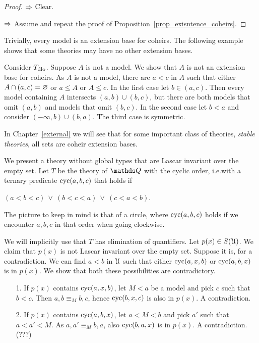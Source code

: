 \documentclass[creche.tex]{subfiles}
\begin{document}
\begin{proof} 
  $\Rightarrow$ Clear.
  
  $\Rightarrow$ Assume  and repeat the proof of Proposition~\ref{prop_exisntence_coheirs}.
\end{proof}
  
Trivially, every model is an extension base for coheirs.
The following example shows that some theories may have no other extension bases.

\begin{example}
  Consider $T_{\rm dlo}$.
  Suppose $A$ is not a model.
  We show that $A$ is not an extension base for coheirs.
  As $A$ is not a model, there are $a<c$ in $A$ such that either $A\cap(a,c)=\varnothing$ or $a\le A$ or $A\le c$.
  In the first case let $b\in(a,c)$. 
  Then every model containing $A$ intersects $(a,b)\cup (b,c)$, but there are both models that omit $(a,b)$ and models that omit $(b,c)$.
  In the second case let $b<a$ and consider $(-\infty,b)\cup (b,a)$.
  The third case is symmetric.\QED
\end{example}

In Chapter~\ref{external} we will see that for some important class of theories, \textit{stable theories}, all sets are coheir extension bases.

\begin{example}\label{ex_circ_order}
  We present a theory without global types that are Lascar invariant over the empty set.
  Let $T$ be the theory of $\QQ$ with the cyclic order, i.e.\@ with a ternary predicate ${\rm cyc}(a, b, c)$ that  holds if

  \hfil $(a < b < c)\ \vee\ (b < c < a)\ \vee\ (c < a < b)$.

  The picture to keep in mind is that of a circle, where ${\rm cyc}(a, b, c)$ holds if we encounter $a,b,c$ in that order when going clockwise.

  We will implicitly use that $T$ has elimination of quantifiers.
  Let $p(x)\in S(\EuScript U)$.
  We claim that $p(x)$ is not Lascar invariant over the empty set.
  Suppose it is, for a contradiction.
  We can find $a<b$ in $\EuScript U$ such that either ${\rm cyc}(a, x, b)$ or ${\rm cyc}(a, b, x)$ is in $p(x)$.
  We show that both these possibilities are contradictory.
  \begin{itemize}
  \item[1.] If $p(x)$ contains ${\rm cyc}(a, x, b)$,
  let $M<a$ be a model and pick $c$ such that $b<c$.
  Then $a, b \equiv_M b, c$, hence ${\rm cyc}(b, x, c)$ is also in $p(x)$.
  A contradiction.
  \item[2.] If $p(x)$ contains ${\rm cyc}(a, b, x)$,
  let $a<M<b$ and pick $a'$ such that $a<a'<M$. 
  As $a, a' \equiv_M b,a$, also  ${\rm cyc}(b, a, x)$ is in $p(x)$.
  A contradiction. (???)\QED
  \end{itemize}
\end{example}
\end{document}
